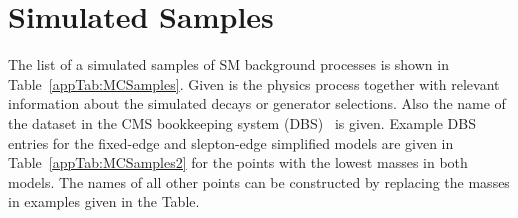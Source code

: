 \chapter{Simulated Samples}
The list of a simulated samples of SM background processes is shown in Table~\ref{appTab:MCSamples}. Given is the physics process together with relevant information about the simulated decays or generator selections. Also the name of the dataset in the CMS bookkeeping system (DBS)~\cite{1742-6596-119-7-072001} is given. Example DBS entries for the fixed-edge and slepton-edge simplified models are given in Table~\ref{appTab:MCSamples2} for the points with the lowest masses in both models. The names of all other points can be constructed by replacing the masses in examples given in the Table. 





